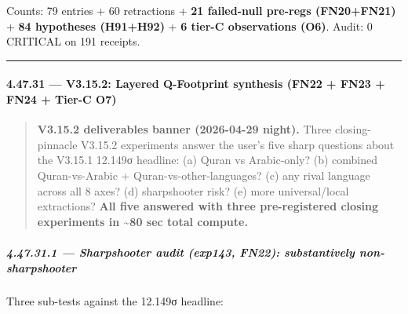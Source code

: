 \documentclass[
]{article}
\begin{document}
Counts: 79 entries + 60 retractions + \textbf{21 failed-null pre-regs
(FN20+FN21)} + \textbf{84 hypotheses (H91+H92)} + \textbf{6 tier-C
observations (O6)}. Audit: 0 CRITICAL on 191 receipts.

\begin{center}\rule{0.5\linewidth}{0.5pt}\end{center}

\paragraph{4.47.31 --- V3.15.2: Layered Q-Footprint synthesis (FN22 +
FN23 + FN24 + Tier-C
O7)}\label{v3.15.2-layered-q-footprint-synthesis-fn22-fn23-fn24-tier-c-o7}

\begin{quote}
\textbf{V3.15.2 deliverables banner (2026-04-29 night).} Three
closing-pinnacle V3.15.2 experiments answer the user's five sharp
questions about the V3.15.1 12.149σ headline: (a) Quran vs Arabic-only?
(b) combined Quran-vs-Arabic + Quran-vs-other-languages? (c) any rival
language across all 8 axes? (d) sharpshooter risk? (e) more
universal/local extractions? \textbf{All five answered with three
pre-registered closing experiments in \textasciitilde80 sec total
compute.}
\end{quote}

\subparagraph{4.47.31.1 --- Sharpshooter audit (exp143, FN22):
substantively
non-sharpshooter}\label{sharpshooter-audit-exp143-fn22-substantively-non-sharpshooter}

Three sub-tests against the 12.149σ headline:
\end{document}
